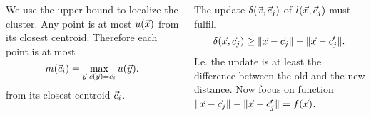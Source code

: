 \documentclass[25pt, a0paper, landscape, margin=0mm, innermargin=15mm, blockverticalspace=15mm, colspace=15mm, subcolspace=8mm]{tikzposter}
\begin{document}
\begin{columns}
{    We use the upper bound to localize the cluster. 
    Any point is at most $u(\vec{x})$ from its closest centroid.
    Therefore each point is at most
      \begin{equation*}
         m(\vec{c}_i) = \max_{\vec{y} \mid \vec{c}(\vec{y}) = \vec{c}_i} u(\vec{y}).
      \end{equation*}
      from its closest centroid $\vec{c}_i$.
  
     The update $\delta(\vec{x}, \vec{c}_j)$ of $l(\vec{x}, \vec{c}_j)$ must fulfill
       \begin{equation*}
         \delta(\vec{x}, \vec{c}_j) \geq \| \vec{x} - \vec{c}_j \| - \| \vec{x} - \vec{c}_j' \|.
       \end{equation*}
     I.e. the update is at least the difference between
     the old and the new distance. Now focus on function
      $\| \vec{x} - \vec{c}_j \| - \| \vec{x} - \vec{c}_j' \| = f(\vec{x})$.
}



\end{columns}
\end{document}
